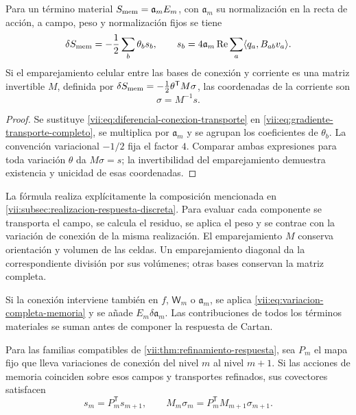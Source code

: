 \begin{theorem}
\label{vii:thm:corriente-conexion-evaluada}
Para un término material \(S_{\rm mem}=\mathfrak a_m E_m\),
con \(\mathfrak a_m\) su normalización en la recta de acción,
a campo, peso y normalización fijos se tiene
\begin{equation}
 \delta S_{\rm mem}=-\frac12\sum_b\theta_b s_b,\qquad
 s_b=4\mathfrak a_m\operatorname{Re}
        \sum_a\langle q_a,B_{ab}v_a\rangle.
 \label{vii:eq:componentes-corriente-conexion}
\end{equation}
Si el emparejamiento celular entre las bases de conexión y corriente
es una matriz invertible \(M\), definida por
\(\delta S_{\rm mem}=-\tfrac12\theta^{\mathsf T}M\sigma\),
las coordenadas de la corriente son
\begin{equation}
 \sigma=M^{-1}s.
 \label{vii:eq:coordenadas-corriente-material}
\end{equation}
\end{theorem}

\begin{proof}
Se sustituye \eqref{vii:eq:diferencial-conexion-transporte} en
\eqref{vii:eq:gradiente-transporte-completo}, se multiplica por
\(\mathfrak a_m\) y se agrupan los coeficientes de
\(\theta_b\). La convención variacional \(-1/2\) fija el
factor \(4\). Comparar ambas expresiones para toda variación
\(\theta\) da \(M\sigma=s\); la invertibilidad del
emparejamiento demuestra existencia y unicidad de esas coordenadas.
\end{proof}

La fórmula realiza explícitamente la composición mencionada en
\ref{vii:subsec:realizacion-respuesta-discreta}. Para evaluar cada
componente se transporta el campo, se calcula el residuo, se aplica el
peso y se contrae con la variación de conexión de la misma realización.
El emparejamiento \(M\) conserva orientación y volumen de las celdas.
Un emparejamiento diagonal da la correspondiente división por sus
volúmenes; otras bases conservan la matriz completa.

Si la conexión interviene también en \(f\), \(\mathsf W_m\)
o \(\mathfrak a_m\), se aplica
\eqref{vii:eq:variacion-completa-memoria} y se añade
\(E_m\delta\mathfrak a_m\). Las contribuciones de todos los
términos materiales se suman antes de componer la respuesta de Cartan.

\begin{corollary}
\label{vii:cor:refinamiento-corriente-conexion}
Para las familias compatibles de
\ref{vii:thm:refinamiento-respuesta}, sea \(P_m\) el mapa fijo
que lleva variaciones de conexión del nivel \(m\) al nivel
\(m+1\). Si las acciones de memoria coinciden sobre esos campos
y transportes refinados, sus covectores satisfacen
\[
 s_m=P_m^{\mathsf T}s_{m+1},\qquad
 M_m\sigma_m=P_m^{\mathsf T}M_{m+1}\sigma_{m+1}.
\]
\end{corollary}

